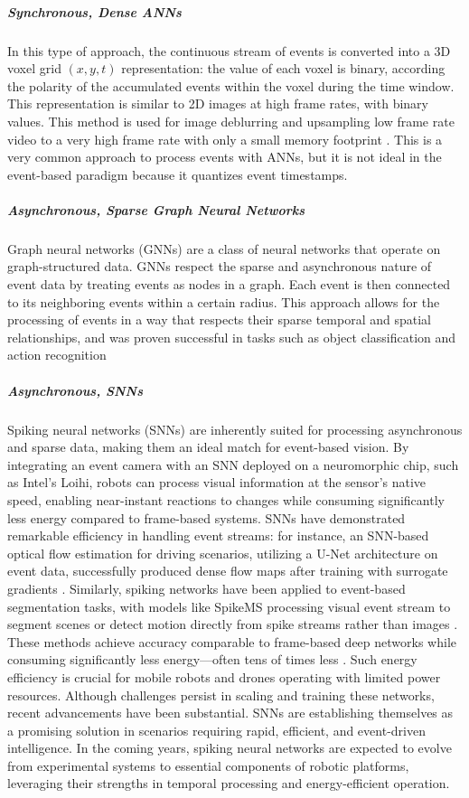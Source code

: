\documentclass{article}
\begin{document}
\subparagraph{Synchronous, Dense ANNs} In this type of approach, the continuous stream of events is converted into a 3D voxel grid $(x,y,t)$ representation: the value of each voxel is binary, according the polarity of the accumulated events within the voxel during the time window. This representation is similar to 2D images at high frame rates, with binary values. This method is used for image deblurring and upsampling low frame rate video to a very high frame rate with only a small memory footprint \cite{tulyakovTimeLensEventbasedVideo2021}. This is a very common approach to process events with ANNs, but it is not ideal in the event-based paradigm because it quantizes event timestamps. 

\subparagraph{Asynchronous, Sparse Graph Neural Networks} Graph neural networks (GNNs) are a class of neural networks that operate on graph-structured data. GNNs respect the sparse and asynchronous nature of event data by treating events as nodes in a graph. Each event is then connected to its neighboring events within a certain radius. This approach allows for the processing of events in a way that respects their sparse temporal and spatial relationships, and was proven successful in tasks such as object classification and action recognition \cite{biGraphBasedSpatioTemporalFeature2020, dengVoxelGraphCNN2021}

\subparagraph{Asynchronous, SNNs} Spiking neural networks (SNNs) are inherently suited for processing asynchronous and sparse data, making them an ideal match for event-based vision. By integrating an event camera with an SNN deployed on a neuromorphic chip, such as Intel's Loihi, robots can process visual information at the sensor's native speed, enabling near-instant reactions to changes while consuming significantly less energy compared to frame-based systems. SNNs have demonstrated remarkable efficiency in handling event streams: for instance, an SNN-based optical flow estimation for driving scenarios, utilizing a U-Net architecture on event data, successfully produced dense flow maps after training with surrogate gradients \cite{cuadradoOpticalFlowEstimation2023}. Similarly, spiking networks have been applied to event-based segmentation tasks, with models like SpikeMS processing visual event stream to segment scenes or detect motion directly from spike streams rather than images \cite{parameshwaraSpikeMSDeepSpiking2021}. These methods achieve accuracy comparable to frame-based deep networks while consuming significantly less energy—often tens of times less \cite{yamazakiSpikingNeuralNetworks2022}. Such energy efficiency is crucial for mobile robots and drones operating with limited power resources. Although challenges persist in scaling and training these networks, recent advancements have been substantial. SNNs are establishing themselves as a promising solution in scenarios requiring rapid, efficient, and event-driven intelligence. In the coming years, spiking neural networks are expected to evolve from experimental systems to essential components of robotic platforms, leveraging their strengths in temporal processing and energy-efficient operation.
\end{document}
